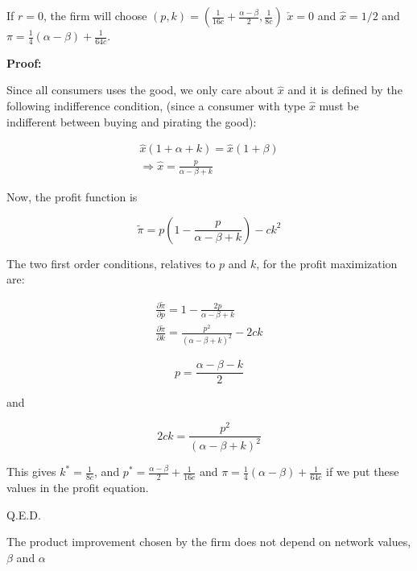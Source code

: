 \begin{proposition}
If $r=0$, the firm will choose $(p,k)=(\frac{1}{16c}+\frac{\alpha-\beta}{2},\frac{1}{8c})$ $\check{x}=0$ and $\hat{x}=1/2$ and $\pi= \frac{1}{4}(\alpha-\beta)+\frac{1}{64c}$.
\end{proposition}

\textbf{Proof:}


Since all consumers uses the good, we only care about $\hat{x}$ and it is defined by the following indifference condition, (since a consumer with type $\hat{x}$ must be indifferent between buying and pirating the good):

\begin{align*}
\hat{x}(1+\alpha+k)=\hat{x}(1+\beta) \\
\Rightarrow \hat{x} = \frac{p}{\alpha - \beta +k}
\end{align*}


Now, the profit function is

\begin{equation*}
\tilde{\pi} = p\left(1-\frac{p}{\alpha - \beta +k}\right)-c k^2
\end{equation*}

The two first order conditions, relatives to $p$ and $k$, for the profit maximization are:

\begin{align*}
\frac{\partial \tilde{\pi}}{\partial p}= 1-\frac{2p}{\alpha - \beta +k}\\
\frac{\partial \tilde{\pi}}{\partial k}=  \frac{p^2}{(\alpha-\beta+k)^2}-2ck 
\end{align*} 

\begin{equation*}
p = \frac{\alpha-\beta-k}{2}
\end{equation*}

and 

\begin{equation*}
2ck = \frac{p^2}{(\alpha-\beta+k)^2}
\end{equation*}

This gives $k^*=\frac{1}{8c}$,  and $p^*=\frac{\alpha-\beta}{2}+\frac{1}{16c}$ and $\pi=\frac{1}{4}(\alpha-\beta)+\frac{1}{64c} $ if we put these values in the profit equation. 

Q.E.D.

\begin{observation}
The product improvement chosen by the firm does not depend on network values, $\beta$ and $\alpha$
\end{observation}


